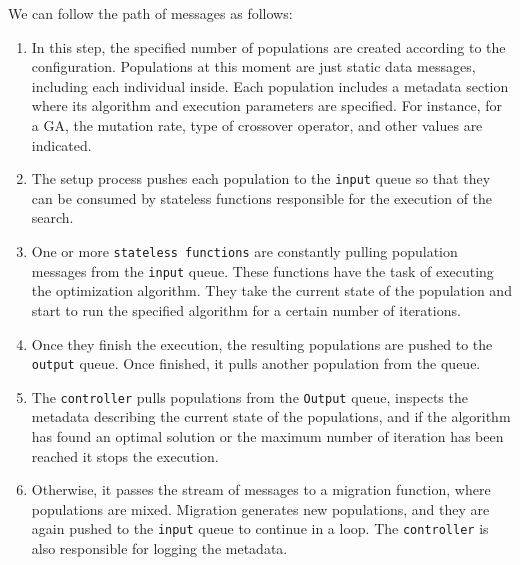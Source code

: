 We can follow the path of messages as follows:

\begin{enumerate}

\item In this step, the specified number of populations are created according
to the configuration. Populations at this moment are just static data messages,
including each individual inside. Each population includes a metadata section
where its algorithm and execution parameters are specified. For instance, for a
GA, the mutation rate, type of crossover operator, and other values are
indicated.

\item The setup process pushes each population to the \texttt{input}
queue so that they can be consumed by stateless functions responsible for the
execution of the search.


\item One or more \texttt{stateless functions} are constantly pulling
population messages from the \texttt{input} queue. These functions have the
task of executing the optimization algorithm. They take the current state of
the population and start to run the specified algorithm for a certain number of
iterations.

\item Once they finish the execution, the resulting populations are pushed to
the \texttt{output} queue. Once finished, it pulls another population from the
queue.

\item The \texttt{controller} pulls populations from the \texttt{Output} queue,
inspects the metadata describing the current state of the populations, and if
the algorithm has found an optimal solution or the maximum number of iteration
has been reached it stops the execution.

\item Otherwise, it passes the stream of messages to a migration function,
where populations are mixed. Migration generates new populations, and they are
again pushed to the \texttt{input} queue to continue in a loop. The
\texttt{controller} is also responsible for logging the metadata.

\end{enumerate}

